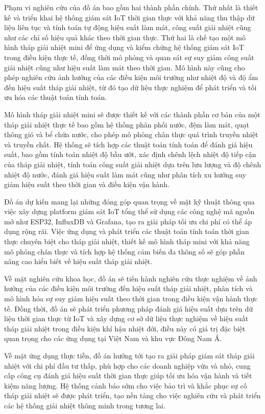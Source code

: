 \documentclass[../main.tex]{subfiles}
\begin{document}
Phạm vi nghiên cứu của đồ án bao gồm hai thành phần chính. Thứ nhất là thiết kế và triển khai hệ thống giám sát IoT thời gian thực với khả năng thu thập dữ liệu liên tục và tính toán tự động hiệu suất làm mát, công suất giải nhiệt cũng như các chỉ số hiệu quả khác theo thời gian thực. Thứ hai là chế tạo một mô hình tháp giải nhiệt mini để ứng dụng và kiểm chứng hệ thống giám sát IoT trong điều kiện thực tế, đồng thời mô phỏng và quan sát sự suy giảm công suất giải nhiệt cũng như hiệu suất làm mát theo thời gian. Mô hình này cũng cho phép nghiên cứu ảnh hưởng của các điều kiện môi trường như nhiệt độ và độ ẩm đến hiệu suất tháp giải nhiệt, từ đó tạo dữ liệu thực nghiệm để phát triển và tối ưu hóa các thuật toán tính toán.

Mô hình tháp giải nhiệt mini sẽ được thiết kế với các thành phần cơ bản của một tháp giải nhiệt thực tế bao gồm hệ thống phân phối nước, đệm làm mát, quạt thông gió và bể chứa nước, cho phép mô phỏng chân thực quá trình truyền nhiệt và truyền chất. Hệ thống sẽ tích hợp các thuật toán tính toán để đánh giá hiệu suất, bao gồm tính toán nhiệt độ bầu ướt, xác định chênh lệch nhiệt độ tiếp cận của tháp giải nhiệt, tính toán công suất giải nhiệt dựa trên lưu lượng và độ chênh nhiệt độ nước, đánh giá hiệu suất làm mát cũng như phân tích xu hướng suy giảm hiệu suất theo thời gian và điều kiện vận hành.

Đồ án dự kiến mang lại những đóng góp quan trọng về mặt kỹ thuật thông qua việc xây dựng platform giám sát IoT tổng thể sử dụng các công nghệ mã nguồn mở như ESP32, InfluxDB và Grafana, tạo ra giải pháp tối ưu chi phí có thể áp dụng rộng rãi. Việc ứng dụng và phát triển các thuật toán tính toán thời gian thực chuyên biệt cho tháp giải nhiệt, thiết kế mô hình tháp mini với khả năng mô phỏng chân thực và tích hợp hệ thống cảm biến đa thông số sẽ góp phần nâng cao hiểu biết về hiệu suất tháp giải nhiệt.

Về mặt nghiên cứu khoa học, đồ án sẽ tiến hành nghiên cứu thực nghiệm về ảnh hưởng của các điều kiện môi trường đến hiệu suất tháp giải nhiệt, phân tích và mô hình hóa sự suy giảm hiệu suất theo thời gian trong điều kiện vận hành thực tế. Đồng thời, đồ án sẽ phát triển phương pháp đánh giá hiệu suất dựa trên dữ liệu thời gian thực từ IoT và xây dựng cơ sở dữ liệu thực nghiệm về hiệu suất tháp giải nhiệt trong điều kiện khí hậu nhiệt đới, điều này có giá trị đặc biệt quan trọng cho các ứng dụng tại Việt Nam và khu vực Đông Nam Á.

Về mặt ứng dụng thực tiễn, đồ án hướng tới tạo ra giải pháp giám sát tháp giải nhiệt với chi phí đầu tư thấp, phù hợp cho các doanh nghiệp vừa và nhỏ, cung cấp công cụ đánh giá hiệu suất thời gian thực giúp tối ưu hóa vận hành và tiết kiệm năng lượng. Hệ thống cảnh báo sớm cho việc bảo trì và khắc phục sự cố tháp giải nhiệt sẽ được phát triển, tạo nền tảng cho việc nghiên cứu và phát triển các hệ thống giải nhiệt thông minh trong tương lai.
\end{document}
